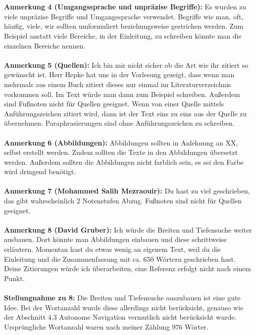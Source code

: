 \documentclass[a4paper,12pt]{book}
\begin{document}
\\\\
\textbf{Anmerkung 4 (Umgangssprache und unpräzise Begriffe):}
Es wurden zu viele unpräzise Begriffe und Umgangssprache verwendet. Begriffe wie \glqq man, oft, häufig, viele, wir\grqq{} sollten umformuliert beziehungsweise gestrichen werden. Zum Beispiel anstatt \glqq viele Bereiche\grqq{}, in der Einleitung, zu schreiben könnte man die einzelnen Bereiche nennen. 
\\ \\
\textbf{Anmerkung 5 (Quellen):}
Ich bin mir nicht sicher ob die Art wie ihr zitiert so gewünscht ist. Herr Hepke hat uns in der Vorlesung gezeigt, dass wenn man mehrmals aus einem Buch zitiert dieses nur einmal im Literaturverzeichnis vorkommen soll. Im Text würde man dann zum Beispiel  \glqq [RN10, 92-102]\grqq{} schreiben. Außerdem sind Fußnoten nicht für Quellen geeignet. Wenn von einer Quelle mittels Anführungszeichen zitiert wird, dann ist der Text eins zu eins aus der Quelle zu übernehmen. Paraphrasierungen sind ohne Anführungszeichen zu schreiben. 
\\ \\
\textbf{Anmerkung 6 (Abbildungen):}
Abbildungen sollten in Anlehnung an XX, selbst erstellt werden. Zudem sollten die Texte in den Abbildungen übersetzt werden.  
Außerdem sollten die Abbildungen nicht farblich sein, es sei den Farbe wird dringend benötigt.
\\ \\
\textbf{Anmerkung 7 (Mohammed Salih Mezraouir):}
Du hast zu viel geschrieben, das gibt wahrscheinlich 2 Notenstufen Abzug. Fußnoten sind nicht für Quellen geeignet.
\\ \\
\textbf{Anmerkung 8 (David Gruber):}
Ich würde die Breiten und Tiefensuche weiter ausbauen. Dort könnte man Abbildungen einbauen und diese schrittweise erläutern. Momentan hast du etwas wenig an eigenem Text, weil du die Einleitung und die Zusammenfassung mit ca. 650 Wörtern geschrieben hast. Deine Zitierungen würde ich überarbeiten, eine Referenz erfolgt nicht nach einem Punkt. 
\\ \\
\textbf{Stellungnahme zu 8:}
Die Breiten und Tiefensuche auszubauen ist eine gute Idee. Bei der Wortanzahl wurde diese allerdings nicht berücksicht, genauso wie der Abschnitt 4.3 Autonome Navigation vermutlich nicht berücksicht wurde.
Ursprüngliche Wortanzahl waren nach meiner Zählung 976 Wörter.
\\ \\
\end{document}
